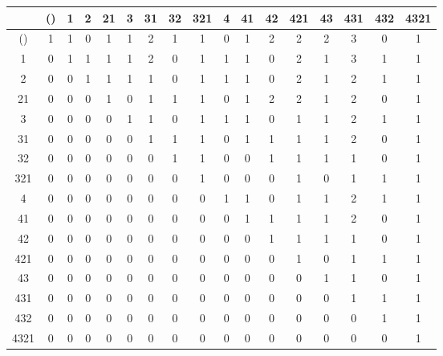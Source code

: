 \begin{tabular}{|c|c|c|c|c|c|c|c|c|c|c|c|c|c|c|c|c|}
\hline
     & () & 1 & 2 & 21 & 3 & 31 & 32 & 321 & 4 & 41 & 42 & 421 & 43 & 431 & 432 & 4321\\ \hline
()   & 1  & 1 & 0 & 1  & 1 & 2  & 1  & 1   & 0 & 1  & 2  & 2   & 2  & 3   & 0   & 1\\
1    & 0  & 1 & 1 & 1  & 1 & 2  & 0  & 1   & 1 & 1  & 0  & 2   & 1  & 3   & 1   & 1\\
2    & 0  & 0 & 1 & 1  & 1 & 1  & 0  & 1   & 1 & 1  & 0  & 2   & 1  & 2   & 1   & 1\\
21   & 0  & 0 & 0 & 1  & 0 & 1  & 1  & 1   & 0 & 1  & 2  & 2   & 1  & 2   & 0   & 1\\
3    & 0  & 0 & 0 & 0  & 1 & 1  & 0  & 1   & 1 & 1  & 0  & 1   & 1  & 2   & 1   & 1\\
31   & 0  & 0 & 0 & 0  & 0 & 1  & 1  & 1   & 0 & 1  & 1  & 1   & 1  & 2   & 0   & 1\\
32   & 0  & 0 & 0 & 0  & 0 & 0  & 1  & 1   & 0 & 0  & 1  & 1   & 1  & 1   & 0   & 1\\
321  & 0  & 0 & 0 & 0  & 0 & 0  & 0  & 1   & 0 & 0  & 0  & 1   & 0  & 1   & 1   & 1\\
4    & 0  & 0 & 0 & 0  & 0 & 0  & 0  & 0   & 1 & 1  & 0  & 1   & 1  & 2   & 1   & 1\\
41   & 0  & 0 & 0 & 0  & 0 & 0  & 0  & 0   & 0 & 1  & 1  & 1   & 1  & 2   & 0   & 1\\
42   & 0  & 0 & 0 & 0  & 0 & 0  & 0  & 0   & 0 & 0  & 1  & 1   & 1  & 1   & 0   & 1\\
421  & 0  & 0 & 0 & 0  & 0 & 0  & 0  & 0   & 0 & 0  & 0  & 1   & 0  & 1   & 1   & 1\\
43   & 0  & 0 & 0 & 0  & 0 & 0  & 0  & 0   & 0 & 0  & 0  & 0   & 1  & 1   & 0   & 1\\
431  & 0  & 0 & 0 & 0  & 0 & 0  & 0  & 0   & 0 & 0  & 0  & 0   & 0  & 1   & 1   & 1\\
432  & 0  & 0 & 0 & 0  & 0 & 0  & 0  & 0   & 0 & 0  & 0  & 0   & 0  & 0   & 1   & 1\\
4321 & 0  & 0 & 0 & 0  & 0 & 0  & 0  & 0   & 0 & 0  & 0  & 0   & 0  & 0   & 0   & 1\\
\hline
\end{tabular}
\\
\vspace*{1cm}
\\\hspace*{-0.6in}
